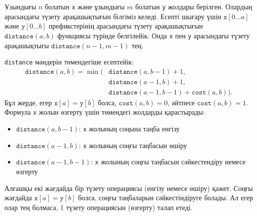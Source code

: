 Ұзындығы $n$ болатын \texttt{x} және 
ұзындығы $m$ болатын \texttt{y} жолдары берілген.
Олардың арасындағы түзету арақашықтығын білгіміз
келеді. Есепті шығару үшін 
$\texttt{x}[0 \ldots a]$ және $\texttt{y}[0 \ldots b]$
префикстерінің арасындағы түзету арақашықтығын 
$\texttt{distance}(a,b)$ функциясы түрінде белгілейік.
Онда \texttt{x} пен \texttt{y} арасындағы түзету
арақашықтығы $\texttt{distance}(n-1,m-1)$ тең.

\texttt{distance} мәндерін төмендегіше есептейік:
\begin{equation*}
\begin{split}
\texttt{distance}(a,b) = \min(& \texttt{distance}(a,b-1)+1, \\
                           & \texttt{distance}(a-1,b)+1, \\
                           & \texttt{distance}(a-1,b-1)+\texttt{cost}(a,b)).
\end{split}
\end{equation*}
Бұл жерде, егер $\texttt{x}[a]=\texttt{y}[b]$ болса, $\texttt{cost}(a,b)=0$,
әйтпесе $\texttt{cost}(a,b)=1$.
Формула \texttt{x} жолын өзгерту үшін төмендегі 
жолдарды қарастырады:
\begin{itemize}
\item $\texttt{distance}(a,b-1)$: \texttt{x} жолының соңына таңба енгізу
\item $\texttt{distance}(a-1,b)$: \texttt{x} жолының соңғы таңбасын өшіру
\item $\texttt{distance}(a-1,b-1)$: \texttt{x} жолының соңғы таңбасын сәйкестендіру немесе өзгерту
\end{itemize}
Алғашқы екі жағдайда бір түзету операциясы (енгізу немесе өшіру) қажет. 
Соңғы жағдайда
$\texttt{x}[a]=\texttt{y}[b]$ болса, соңғы таңбаларын
сәйкестіндіруге болады. Ал егер олар тең болмаса,
1 түзету операциясын (өзгерту) талап етеді.

